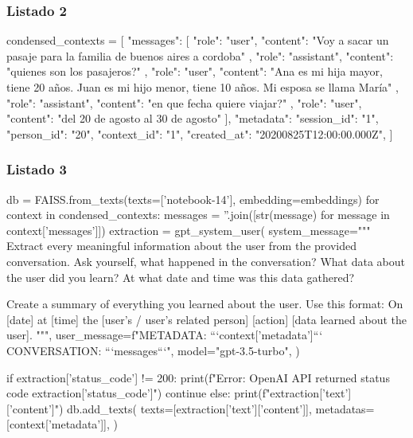 \subsubsection{Listado 2}
\label{anexo:code-4-1-14-2}

\begin{APACode}
condensed_contexts = [
    {
        "messages": [
            {
                "role": "user",
                "content": "Voy a sacar un pasaje para la familia de buenos aires a cordoba"
            },
            {
                "role": "assistant",
                "content": "quienes son los pasajeros?"
            },
            {
                "role": "user",
                "content": "Ana es mi hija mayor, tiene 20 años. Juan es mi hijo menor, tiene 10 años. Mi esposa se llama María"
            },
            {
                "role": "assistant",
                "content": "en que fecha quiere viajar?"
            },
            {
                "role": "user",
                "content": "del 20 de agosto al 30 de agosto"
            }
        ],
        "metadata": {
            "session_id": "1",
            "person_id": "20",
            "context_id": "1",
            "created_at": "20200825T12:00:00.000Z",
        }
    }
]
\end{APACode}

\subsubsection{Listado 3}
\label{anexo:code-4-1-14-3}

\begin{APACode}
db = FAISS.from_texts(texts=['notebook-14'], embedding=embeddings)
for context in condensed_contexts:
    messages = ''.join([str(message) for message in context['messages']])
    extraction = gpt_system_user(
        system_message="""
Extract every meaningful information about the user from the provided conversation.
Ask yourself, what happened in the conversation?
What data about the user did you learn?
At what date and time was this data gathered?

Create a summary of everything you learned about the user. Use this format:
On [date] at [time] the [user's / user's related person] [action] [data learned about the user].
        """,
        user_message=f"METADATA: ```{context['metadata']}``` CONVERSATION: ```{messages}```",
        model="gpt-3.5-turbo",
    )
    
    if extraction['status_code'] != 200:
        print(f"Error: OpenAI API returned status code {extraction['status_code']}")
        continue
    else:
        print(f"{extraction['text']['content']}")
        db.add_texts(
            texts=[extraction['text']['content']],
            metadatas=[context['metadata']],
        )
\end{APACode}

